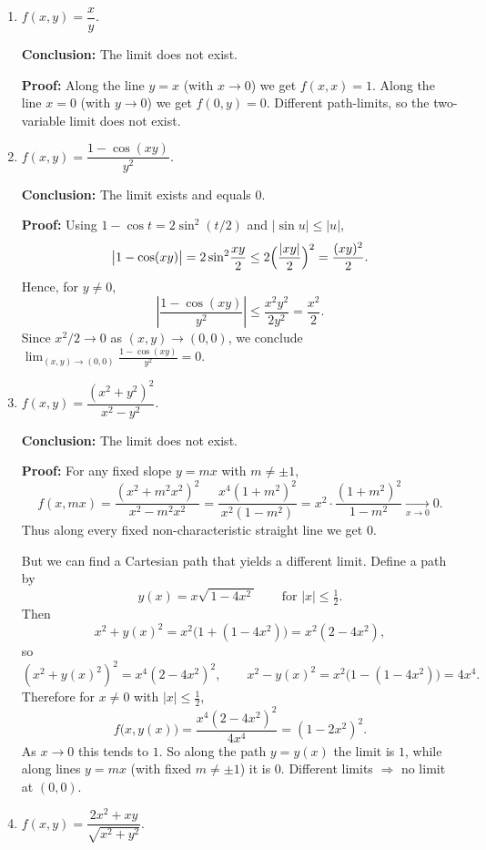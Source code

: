 \documentclass[12pt]{article}
\begin{document}
\begin{correctionbox}
\begin{enumerate}
\item \(f(x,y)=\dfrac{x}{y}.\)

\textbf{Conclusion:} The limit does not exist.

\textbf{Proof:} Along the line \(y=x\) (with \(x\to0\)) we get \(f(x,x)=1\). Along the line \(x=0\) (with \(y\to0\)) we get \(f(0,y)=0\). Different path-limits, so the two-variable limit does not exist.

\bigskip

\item \(f(x,y)=\dfrac{1-\cos(xy)}{y^2}.\)

\textbf{Conclusion:} The limit exists and equals \(0\).

\textbf{Proof:} Using \(1-\cos t = 2\sin^2(t/2)\) and \(|\sin u|\le|u|\),
\[
\bigl|1-\cos(xy)\bigr| = 2\sin^2\!\frac{xy}{2}\le 2\Bigl(\frac{|xy|}{2}\Bigr)^2=\frac{(xy)^2}{2}.
\]
Hence, for \(y\neq0\),
\[
\left|\frac{1-\cos(xy)}{y^2}\right|\le \frac{x^2y^2}{2y^2}=\frac{x^2}{2}.
\]
Since \(x^2/2\to0\) as \((x,y)\to(0,0)\), we conclude \(\displaystyle\lim_{(x,y)\to(0,0)}\frac{1-\cos(xy)}{y^2}=0.\)

\bigskip

\item \(f(x,y)=\dfrac{(x^2+y^2)^2}{x^2-y^2}.\)

\textbf{Conclusion:} The limit does not exist.

\textbf{Proof:} For any fixed slope \(y=mx\) with \(m\neq\pm1\),
\[
f(x,mx)=\frac{(x^2+m^2x^2)^2}{x^2-m^2x^2}
=\frac{x^4(1+m^2)^2}{x^2(1-m^2)}
= x^2\cdot\frac{(1+m^2)^2}{1-m^2}\xrightarrow[x\to0]{}0.
\]
Thus along every fixed non-characteristic straight line we get \(0\).

But we can find a Cartesian path that yields a different limit. Define a path by
\[
y(x)=x\sqrt{\,1-4x^2\,}\qquad\text{for }|x|\le\tfrac12.
\]
Then
\[
x^2+y(x)^2 = x^2\bigl(1+(1-4x^2)\bigr)=x^2(2-4x^2),
\]
so
\[
(x^2+y(x)^2)^2 = x^4(2-4x^2)^2,
\qquad
x^2-y(x)^2 = x^2\bigl(1-(1-4x^2)\bigr)=4x^4.
\]
Therefore for \(x\neq0\) with \(|x|\le\tfrac12\),
\[
f\bigl(x,y(x)\bigr)=\frac{x^4(2-4x^2)^2}{4x^4}=(1-2x^2)^2.
\]
As \(x\to0\) this tends to \(1\). So along the path \(y=y(x)\) the limit is \(1\), while along lines \(y=mx\) (with fixed \(m\neq\pm1\)) it is \(0\). Different limits \(\Rightarrow\) no limit at \((0,0)\).

\bigskip

\item \(f(x,y)=\dfrac{2x^2+xy}{\sqrt{x^2+y^2}}.\)


\end{enumerate}
\end{correctionbox}
\end{document}
